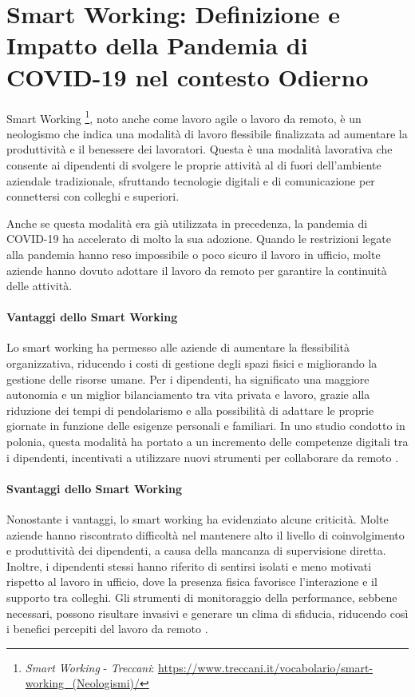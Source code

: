 \documentclass[12pt,a4paper,openright,twoside]{book}
\begin{document}

\section{Smart Working: Definizione e Impatto della Pandemia di COVID-19 nel contesto Odierno}

Smart Working \footnote{\emph{Smart Working} - \emph{Treccani}: \url{https://www.treccani.it/vocabolario/smart-working_(Neologismi)/}}, noto anche come lavoro agile o lavoro da remoto, è un neologismo che indica una modalità di lavoro flessibile finalizzata ad aumentare la produttività e il benessere dei lavoratori. Questa è una modalità lavorativa che consente ai dipendenti di svolgere le proprie attività al di fuori dell’ambiente aziendale tradizionale, sfruttando tecnologie digitali e di comunicazione per connettersi con colleghi e superiori.

Anche se questa modalità era già utilizzata in precedenza, la pandemia di COVID-19 ha accelerato di molto la sua adozione. Quando le restrizioni legate alla pandemia hanno reso impossibile o poco sicuro il lavoro in ufficio, molte aziende hanno dovuto adottare il lavoro da remoto per garantire la continuità delle attività\cite{urbaniec2022}.

\paragraph{Vantaggi dello Smart Working}
Lo smart working ha permesso alle aziende di aumentare la flessibilità organizzativa, riducendo i costi di gestione degli spazi fisici e migliorando la gestione delle risorse umane. Per i dipendenti, ha significato una maggiore autonomia e un miglior bilanciamento tra vita privata e lavoro, grazie alla riduzione dei tempi di pendolarismo e alla possibilità di adattare le proprie giornate in funzione delle esigenze personali e familiari. In uno studio condotto in polonia, questa modalità ha portato a un incremento delle competenze digitali tra i dipendenti, incentivati a utilizzare nuovi strumenti per collaborare da remoto \cite{urbaniec2022}.

\paragraph{Svantaggi dello Smart Working}
Nonostante i vantaggi, lo smart working ha evidenziato alcune criticità. Molte aziende hanno riscontrato difficoltà nel mantenere alto il livello di coinvolgimento e produttività dei dipendenti, a causa della mancanza di supervisione diretta. Inoltre, i dipendenti stessi hanno riferito di sentirsi isolati e meno motivati rispetto al lavoro in ufficio, dove la presenza fisica favorisce l’interazione e il supporto tra colleghi. Gli strumenti di monitoraggio della performance, sebbene necessari, possono risultare invasivi e generare un clima di sfiducia, riducendo così i benefici percepiti del lavoro da remoto \cite{urbaniec2022}.
\end{document}
